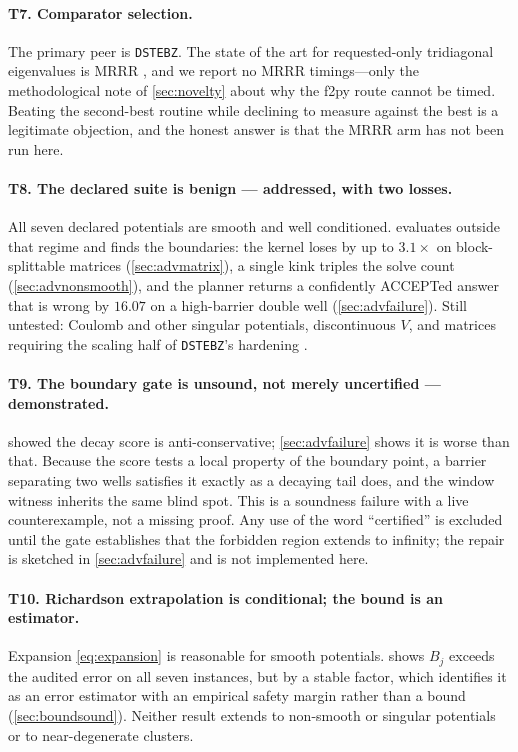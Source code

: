 \documentclass[twocolumn,10pt,a4paper]{article}
\theoremstyle{plain}
\theoremstyle{definition}
\newcommand{\ACCEPT}{\textsf{ACCEPT}}
\begin{document}
\paragraph{T7. Comparator selection.}
The primary peer is \texttt{DSTEBZ}. The state of the art for requested-only
tridiagonal eigenvalues is MRRR \citep{dhillon2004}, and we report no MRRR
timings---only the methodological note of \cref{sec:novelty} about why the f2py
route cannot be timed. Beating the second-best routine while declining to
measure against the best is a legitimate objection, and the honest answer is
that the MRRR arm has not been run here.

\paragraph{T8. The declared suite is benign --- \textbf{addressed, with two
losses}.} All seven declared potentials are smooth and well conditioned.
 evaluates outside that regime and finds the boundaries:
the kernel loses by up to $3.1\times$ on block-splittable matrices
(\cref{sec:advmatrix}), a single kink triples the solve count
(\cref{sec:advnonsmooth}), and the planner returns a confidently \ACCEPT{}ed
answer that is wrong by $16.07$ on a high-barrier double well
(\cref{sec:advfailure}). Still untested: Coulomb and other singular potentials,
discontinuous $V$, and matrices requiring the scaling half of
\texttt{DSTEBZ}'s hardening \citep{demmel1995}.

\paragraph{T9. The boundary gate is unsound, not merely uncertified ---
\textbf{demonstrated}.}  showed the decay score is
anti-conservative; \cref{sec:advfailure} shows it is worse than that. Because
the score tests a local property of the boundary point, a barrier separating two
wells satisfies it exactly as a decaying tail does, and the window witness
inherits the same blind spot. This is a soundness failure with a live
counterexample, not a missing proof. Any use of the word ``certified'' is
excluded until the gate establishes that the forbidden region extends to
infinity; the repair is sketched in \cref{sec:advfailure} and is not
implemented here.

\paragraph{T10. Richardson extrapolation is conditional; the bound is an
estimator.} Expansion \eqref{eq:expansion} is reasonable for smooth potentials.
 shows $B_{j}$ exceeds the audited error on all seven instances,
but by a stable factor, which identifies it as an error estimator with an
empirical safety margin rather than a bound (\cref{sec:boundsound}). Neither
result extends to non-smooth or singular potentials or to near-degenerate
clusters.
\end{document}

